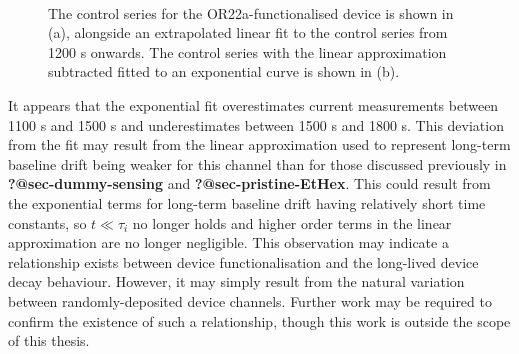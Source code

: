 \documentclass[
  a4paper,
]{scrbook}
\begin{document}
\begin{figure}
\begin{minipage}[t]{0.70\linewidth}
{{}

}

\end{minipage}%
%
\begin{minipage}[t]{0.15\linewidth}

{\centering 

~

}

\end{minipage}%

\caption{\label{fig-OR22a-control-series}The control series for the
OR22a-functionalised device is shown in (a), alongside an extrapolated
linear fit to the control series from 1200 s onwards. The control series
with the linear approximation subtracted fitted to an exponential curve
is shown in (b).}

\end{figure}

It appears that the exponential fit overestimates current measurements
between 1100 s and 1500 s and underestimates between 1500 s and 1800 s.
This deviation from the fit may result from the linear approximation
used to represent long-term baseline drift being weaker for this channel
than for those discussed previously in \textbf{?@sec-dummy-sensing} and
\textbf{?@sec-pristine-EtHex}. This could result from the exponential
terms for long-term baseline drift having relatively short time
constants, so \(t\ll\tau_i\) no longer holds and higher order terms in
the linear approximation are no longer negligible. This observation may
indicate a relationship exists between device functionalisation and the
long-lived device decay behaviour. However, it may simply result from
the natural variation between randomly-deposited device channels.
Further work may be required to confirm the existence of such a
relationship, though this work is outside the scope of this thesis.
\end{document}
